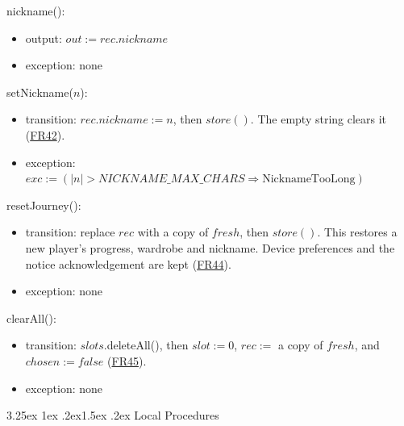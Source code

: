 \documentclass[10pt, titlepage]{article}
\makeatletter
\newcommand{\srsurl}{https://team-hindsight.github.io/ophthamology-game/SRS/SRS.pdf}
\newcommand{\srsitemref}[2]{\href{\srsurl\#nameddest=#1}{#2}}
\renewcommand\paragraph{\@startsection{paragraph}{4}{\z@}%
  {3.25ex \@plus 1ex \@minus .2ex}{1.5ex \@plus .2ex}%
  {\normalfont\normalsize\bfseries}}
\newcommand{\T}[1]{\mathit{#1}}          %
\newcommand{\out}{\mathit{out}}
\newcommand{\exc}{\mathit{exc}}
\newcommand{\false}{\mathit{false}}
\makeatother
\begin{document}
\begin{samepage}
\noindent nickname():
\begin{itemize}
\item output: $\out := \T{rec}.\T{nickname}$
\item exception: none
\end{itemize}
\end{samepage}
\par\pagebreak[0]

\begin{samepage}
\noindent setNickname($n$):
\begin{itemize}
\item transition: $\T{rec}.\T{nickname} := n$, then $\T{store}()$.
  The empty string clears it (\srsitemref{FR_Nickname}{FR42}).
\item exception: $\exc := (|n| > \T{NICKNAME\_MAX\_CHARS}
  \Rightarrow \text{NicknameTooLong})$
\end{itemize}
\end{samepage}
\par\pagebreak[0]

\begin{samepage}
\noindent resetJourney():
\begin{itemize}
\item transition: replace $\T{rec}$ with a copy of $\T{fresh}$,
  then $\T{store}()$. This restores a new player's progress, wardrobe and
  nickname. Device preferences and the notice acknowledgement are kept
  (\srsitemref{FR_ResetJourney}{FR44}).
\item exception: none
\end{itemize}
\end{samepage}
\par\pagebreak[0]

\begin{samepage}
\noindent clearAll():
\begin{itemize}
\item transition: $\T{slots}$.deleteAll(), then $\T{slot} := 0$,
  $\T{rec} :=$ a copy of $\T{fresh}$, and $\T{chosen} := \false$
  (\srsitemref{FR_ClearAllData}{FR45}).
\item exception: none
\end{itemize}
\end{samepage}
\par\pagebreak[0]

\paragraph{Local Procedures}
\end{document}
